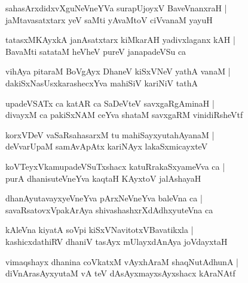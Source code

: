 \documentclass[twoside,12pt,openright]{book}
\newcounter{shloka}[chapter]
\begin{document}
\begin{shloka}%
sahasArxdidxvXguNeVneYVa surapUjoyxV BaveVnanxraH |\\
jaMtavasatxtarx yeV saMti yAvaMtoV ciVvanaM yayuH 
\end{shloka}

\begin{shloka}%
tatasxMKAyxkA janAsatxtarx kiMkarAH yadivxlaganx kAH |\\
BavaMti satataM heVheV pureV janapadeVSu ca 
\end{shloka}

\begin{shloka}%
vihAya pitaraM BoVgAyx DhaneV kiSxVNeV yathA vanaM |\\
dakiSxNasUsxkarashecxYva mahiSiV kariNiV tathA 
\end{shloka}

\begin{shloka}%
upadeVSATx ca katAR ca SaDeVteV savxgaRgAminaH |\\
divayxM ca pakiSxNAM ceYva shataM savxgaRM vinidiRsheVtf
\end{shloka}

\begin{shloka}%
korxVDeV vaSaRsahasarxM tu mahiSayxyutahAyanaM |\\
deVvarUpaM samAvApAtx kariNAyx lakaSxmicayxteV 
\end{shloka}

\begin{shloka}%
koVTeyxVkamupadeVSuTxshacx katuRrakaSxyameVva ca |\\
purA dhanisuteVneYva kaqtaH KAyxtoV jalAshayaH 
\end{shloka}

\begin{shloka}%
dhanAyutavayxyeVneYva pArxNeVneYva baleVna ca |\\
savaRsatovxVpakArAya shivashashxrXdAdhxyuteVna ca 
\end{shloka}

\begin{shloka}%
kAleVna kiyatA soVpi kiSxVNavitotxVBavatikxla |\\
kashicxdathiRV dhaniV tasAyx mUlayxdAnAya joVdayxtaH 
\end{shloka}

\begin{shloka}%
vimaqshayx dhanina coVkatxM vAyxhAraM shaqNutAdhunA |\\
diVnArasAyxyutaM vA teV dAsAyxmayxsAyxshacx kAraNAtf
\end{shloka}
\end{document}
